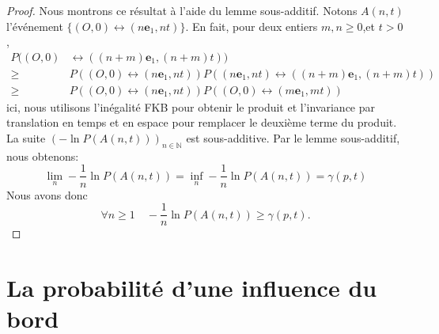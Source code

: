 \documentclass[titlepage,a4paper,12pt]{article}
\newcounter{prop}
\newtheorem{tension}[prop]{Proposition}
\begin{document}
\begin{proof}
Nous montrons ce résultat à l'aide du lemme sous-additif. Notons $A(n,t)$ l'événement $\{(O,0)\longleftrightarrow (n\mathbf{e}_1,nt)\}$. En fait, pour deux entiers $m,n\geqslant 0$,et $t>0$,
\begin{align*}
P((O,0)& \leftrightarrow ((n+m)\mathbf{e}_1,(n+m)t)) \\
\geqslant & P((O,0)\leftrightarrow (n\mathbf{e}_1,nt))P((n\mathbf{e}_1,nt)\leftrightarrow ((n+m)\mathbf{e}_1,(n+m)t))\\
\geqslant & P((O,0)\leftrightarrow (n\mathbf{e}_1,nt))P((O,0)\leftrightarrow (m\mathbf{e}_1,mt))
\end{align*}
ici, nous utilisons l'inégalité FKB \cite{grimmett1999percolation} pour obtenir le produit et l'invariance par translation en temps et en espace pour remplacer le deuxième terme du produit. La suite $(-\ln P(A(n,t)))_{n\in \mathbb{N}}$ est sous-additive. Par le lemme sous-additif, nous obtenons:
$$
\lim_{n}-\frac{1}{n}\ln P(A(n,t)) = \inf_{n} -\frac{1}{n}\ln P(A(n,t)) = \gamma(p,t)
$$
Nous avons donc
$$ \forall n\geqslant 1 \quad -\frac{1}{n}\ln P(A(n,t)) \geqslant \gamma(p,t).
$$
\end{proof}

\begin{comment}
Nous étudions la constante $\gamma(p,t)$ et nous avons la proposition suivante:
\begin{tension}$\frac{\gamma(p,t)}{\gamma(p,0)} \rightarrow 1$ quand $p\rightarrow 1$.
\end{tension}
\begin{proof}
Nous utilisons le fait que $\lim_n \frac{1}{n}\ln P(O\longleftrightarrow n\mathbf{e}_1) = \lim_n \frac{1}{n}\ln P(O\longleftrightarrow \partial \Lambda_n)$ et nous considérons une boite de taille $n$. Nous remarquons le nombre d'arête qui se ferme entre $[0,t]$ est borné par une loi de Poisson de paramètre $n^2(1-p)t$. Nous notons $N$ le nombre de bout d'un space-time chemin, c'est-à-dire le nombre de chemins fermés tel que $$ (O,0) = (x_1,\theta_1) \longleftrightarrow (x_1,\theta_2) \longleftrightarrow (x_2,\theta_2)\dots \longleftrightarrow (x_N,\theta_N) \longleftrightarrow (\partial\Lambda_n,t).
$$
Nous avons donc $N$ est borné par une variable aléatoire de loi de Poisson de paramètre $n^2(1-p)t$. Quand $p\rightarrow 1$, nous pouvons rendre $N$ d'ordre de 1 avec une probabilité proche de 1 et nous avons le résultat.
\end{proof}
\end{comment}
\section{La probabilité d'une influence du bord}
\end{document}
